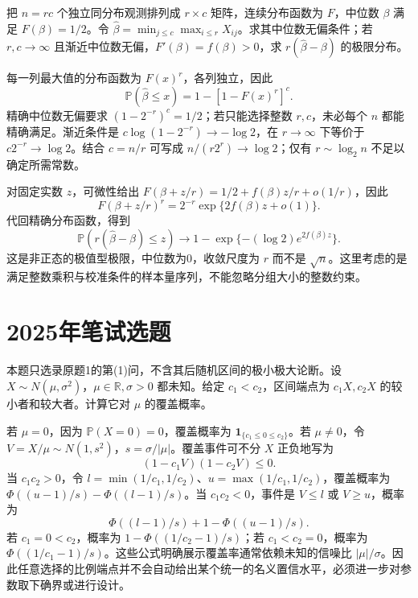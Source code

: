 \documentclass[UTF8,12pt,a4paper,fontset=fandol]{ctexbook}
\newcommand{\PP}{\mathbb P}
\begin{document}
\begin{example}[原题5：分组极大值再取最小值的中位数估计]\label{yau:2024-5}
把 $n=rc$ 个独立同分布观测排列成 $r\times c$ 矩阵，连续分布函数为 $F$，中位数 $\beta$ 满足 $F(\beta)=1/2$。令 $\widehat\beta=\min_{j\le c}\max_{i\le r}X_{ij}$。求其中位数无偏条件；若 $r,c\to\infty$ 且渐近中位数无偏，$F'(\beta)=f(\beta)>0$，求 $r(\widehat\beta-\beta)$ 的极限分布。
\end{example}
\begin{solve}
每一列最大值的分布函数为 $F(x)^r$，各列独立，因此
\[
\PP(\widehat\beta\le x)=1-[1-F(x)^r]^c.
\]
精确中位数无偏要求 $(1-2^{-r})^c=1/2$；若只能选择整数 $r,c$，未必每个 $n$ 都能精确满足。渐近条件是 $c\log(1-2^{-r})\to-\log2$，在 $r\to\infty$ 下等价于 $c2^{-r}\to\log2$。结合 $c=n/r$ 可写成 $n/(r2^r)\to\log2$；仅有 $r\sim\log_2 n$ 不足以确定所需常数。

对固定实数 $z$，可微性给出 $F(\beta+z/r)=1/2+f(\beta)z/r+o(1/r)$，因此
\[
F(\beta+z/r)^r=2^{-r}\exp\{2f(\beta)z+o(1)\}.
\]
代回精确分布函数，得到
\[
\PP(r(\widehat\beta-\beta)\le z)\to
1-\exp\{-(\log2)e^{2f(\beta)z}\}.
\]
这是非正态的极值型极限，中位数为0，收敛尺度为 $r$ 而不是 $\sqrt n$。这里考虑的是满足整数乘积与校准条件的样本量序列，不能忽略分组大小的整数约束。
\end{solve}

\section{2025年笔试选题}
\begin{example}[原题1(1)：单个正态观测的比例型置信区间]\label{yau:2025-1}
本题只选录原题1的第(1)问，不含其后随机区间的极小极大论断。设 $X\sim N(\mu,\sigma^2)$，$\mu\in\mathbb R,\sigma>0$ 都未知。给定 $c_1<c_2$，区间端点为 $c_1X,c_2X$ 的较小者和较大者。计算它对 $\mu$ 的覆盖概率。
\end{example}
\begin{solve}
若 $\mu=0$，因为 $\PP(X=0)=0$，覆盖概率为 $\mathbf1_{\{c_1\le0\le c_2\}}$。若 $\mu\ne0$，令 $V=X/\mu\sim N(1,s^2)$，$s=\sigma/|\mu|$。覆盖事件可不分 $X$ 正负地写为
\[
(1-c_1V)(1-c_2V)\le0.
\]
当 $c_1c_2>0$，令 $l=\min(1/c_1,1/c_2)$、$u=\max(1/c_1,1/c_2)$，覆盖概率为 $\Phi((u-1)/s)-\Phi((l-1)/s)$。当 $c_1c_2<0$，事件是 $V\le l$ 或 $V\ge u$，概率为
\[
\Phi((l-1)/s)+1-\Phi((u-1)/s).
\]
若 $c_1=0<c_2$，概率为 $1-\Phi((1/c_2-1)/s)$；若 $c_1<c_2=0$，概率为 $\Phi((1/c_1-1)/s)$。这些公式明确展示覆盖率通常依赖未知的信噪比 $|\mu|/\sigma$。因此任意选择的比例端点并不会自动给出某个统一的名义置信水平，必须进一步对参数取下确界或进行设计。
\end{solve}
\end{document}
